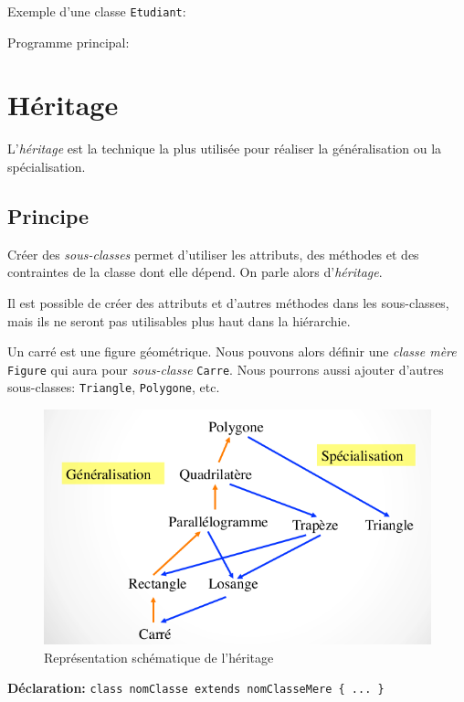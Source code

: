 	Exemple d'une classe \lstinline|Etudiant|:
	
	
	Programme principal:
	
			
	\section{Héritage}
	
		L'\emph{héritage} est la technique la plus utilisée pour réaliser la généralisation ou la spécialisation.
	
		\subsection{Principe}
		
			Créer des \emph{sous-classes} permet d'utiliser les attributs, des méthodes et des contraintes de la classe dont elle dépend. On parle alors d'\emph{héritage}.
			\begin{remarque}
				Il est possible de créer des attributs et d'autres méthodes dans les sous-classes, mais ils ne seront pas utilisables plus haut dans la hiérarchie.
			\end{remarque}
		
			\begin{exemple}
				Un carré est une figure géométrique. Nous pouvons alors définir une \emph{classe mère} \lstinline|Figure| qui aura pour \emph{sous-classe} \lstinline|Carre|. Nous pourrons aussi ajouter d'autres sous-classes: \lstinline|Triangle|, \lstinline|Polygone|, etc.
			\end{exemple}
		
			\begin{figure}[h]
				\centering
				\includegraphics[width=0.5\linewidth]{images/schemaheritage}
				\caption{Représentation schématique de l'héritage}
				\label{fig:schemaheritage}
			\end{figure}
			
			
			\textbf{Déclaration:} \lstinline|class nomClasse extends nomClasseMere { ... }|
			
